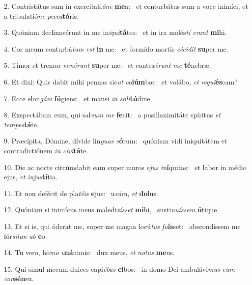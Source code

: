 2. Contristátus sum in exercitati\textit{ó}\textit{ne} \textbf{me}a: \ast\  et conturbátus sum a voce inimíci, et a tribulatió\textit{ne} \textit{pec}\textit{ca}\textbf{tó}ris.\

3. Quóniam declinavérunt in me in\textit{i}\textit{qui}\textbf{tá}tes: \ast\  et in ira molés\textit{ti} \textit{e}\textit{rant} \textbf{mi}hi.\

4. Cor meum conturbá\textit{tum} \textit{est} \textbf{in} me: \ast\  et formído mortis \textit{cé}\textit{ci}\textit{dit} \textbf{su}per me.\

5. Timor et tremor ve\textit{né}\textit{runt} \textbf{su}per me: \ast\  et conte\textit{xé}\textit{runt} \textit{me} \textbf{té}nebræ.\

6. Et dixi: Quis dabit mihi pennas sic\textit{ut} \textit{co}\textbf{lúm}bæ, \ast\  et volábo, \textit{et} \textit{re}\textit{qui}\textbf{és}cam?\

7. Ecce elon\textit{gá}\textit{vi} \textbf{fú}giens: \ast\  et mansi \textit{in} \textit{so}\textit{li}\textbf{tú}dine.\

8. Exspectábam eum, qui sal\textit{vum} \textit{me} \textbf{fe}cit: \ast\  a pusillanimitáte spíritus \textit{et} \textit{tem}\textit{pes}\textbf{tá}te.\

9. Præcípita, Dómine, dívide lin\textit{guas} \textit{e}\textbf{ó}rum: \ast\  quóniam vidi iniquitátem et contradictiónem \textit{in} \textit{ci}\textit{vi}\textbf{tá}te.\

10. Die ac nocte circúmdabit eam super muros e\textit{jus} \textit{in}\textbf{í}quitas: \ast\  et labor in médio ejus, \textit{et} \textit{in}\textit{jus}\textbf{tí}tia.\

11. Et non defécit de pla\textit{té}\textit{is} \textbf{e}jus: \ast\  u\textit{sú}\textit{ra}, \textit{et} \textbf{do}lus.\

12. Quóniam si inimícus meus maledi\textit{xís}\textit{set} \textbf{mi}hi, \ast\  susti\textit{nu}\textit{ís}\textit{sem} \textbf{ú}tique.\

13. Et si is, qui óderat me, super me magna locú\textit{tus} \textit{fu}\textbf{ís}set: \ast\  abscondíssem me fór\textit{si}\textit{tan} \textit{ab} \textbf{e}o.\

14. Tu vero, ho\textit{mo} \textit{u}\textbf{ná}nimis: \ast\  dux meus, \textit{et} \textit{no}\textit{tus} \textbf{me}us.\

15. Qui simul mecum dulces capi\textit{é}\textit{bas} \textbf{ci}bos: \ast\  in domo Dei ambulávi\textit{mus} \textit{cum} \textit{con}\textbf{sén}su.\


